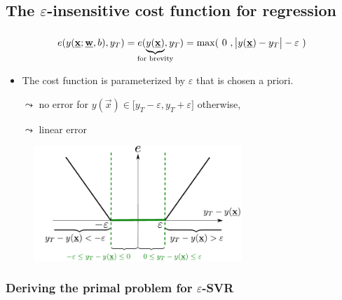 \subsection{The $\varepsilon$-insensitive cost function for regression}

\begin{frame}\frametitle{\subsecname}

\slidesonly{\vspace{-5mm}}

\begin{equation}
e(y(\vec x; \vec w, b), y_{T})
= e(\underbrace{y(\vec x)}_{\mathclap{\text{for brevity}}}, y_{T})
= \max(~0~, \big|y(\vec x) - y_{T}\big|-\varepsilon~)
\end{equation}

\begin{itemize}
\item The cost function is parameterized by $\varepsilon$ that is chosen a priori.
\item[$\leadsto$] no error for $
y(\vec x) \in \lbrack y_{T}-\varepsilon, y_{T}+\varepsilon\rbrack$
otherwise,
\item[$\leadsto$] linear error
\end{itemize}

\begin{figure}[h]
     \centering
	 \includegraphics[width=0.7\textwidth]{img/cost_eps}%
	 \label{fig:cost}
\end{figure}
    
\end{frame}

\subsubsection{Deriving the primal problem for $\varepsilon$-SVR}

